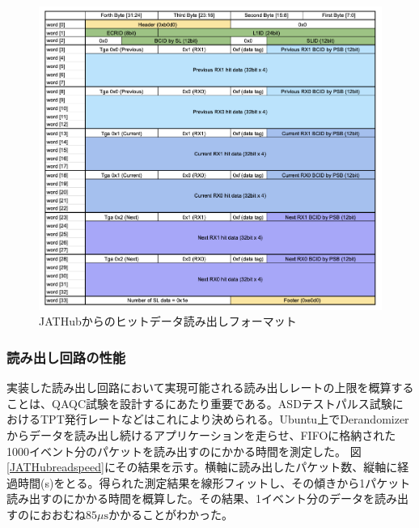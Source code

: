 \begin{figure} 
\centering
\includegraphics[width=16cm]{fig/QAQC/JATHubhitformat.png}
\caption[JATHubからのヒットデータ読み出しフォーマット]{JATHubからのヒットデータ読み出しフォーマット}
\label{JATHubhitformat}
\end{figure}

\subsubsection{読み出し回路の性能} \par
実装した読み出し回路において実現可能される読み出しレートの上限を概算することは、QAQC試験を設計するにあたり重要である。ASDテストパルス試験におけるTPT発行レートなどはこれにより決められる。Ubuntu上でDerandomizerからデータを読み出し続けるアプリケーションを走らせ、FIFOに格納された1000イベント分のパケットを読み出すのにかかる時間を測定した。
図\ref{JATHubreadspeed}にその結果を示す。横軸に読み出したパケット数、縦軸に経過時間(s)をとる。得られた測定結果を線形フィットし、その傾きから1パケット読み出すのにかかる時間を概算した。その結果、1イベント分のデータを読み出すのにおおむね$85 \mu\mathrm{s}$かかることがわかった。

